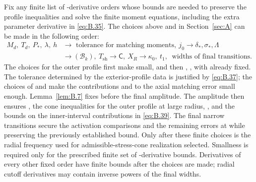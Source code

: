 \begin{remark}\label{rem:B.9}
Fix any finite list of -derivative orders whose bounds are needed to preserve
the profile inequalities and solve the finite moment equations, including the extra parameter
derivative in \eqref{eq:B.35}. The choices above and in Section~\ref{sec:A} can be made in the following order:
\begin{equation}
\begin{aligned}
 M_d,\ T_d,\ P_*,\ \lambda,\ h
 &\longrightarrow \text{ tolerance for matching moments},\ j_0
 \longrightarrow \delta_*,\sigma_*,\Lambda\\
 &\longrightarrow (\mathcal B_k),\ T_{\mathrm{sh}}
 \longrightarrow \mathsf C,\ X_R
 \longrightarrow \kappa_0,\ t_1,\ \text{ widths of final transitions}.
\end{aligned}
\tag{B.40}\label{eq:B.40}
\end{equation}
The choices for the outer profile first make
 small, and then
,
, with  already fixed. The tolerance determined by the exterior-profile data
is justified by \eqref{eq:B.37}; the choices of  and  make the contributions
 and  to the
axial matching error small enough. Lemma~\ref{lem:B.7} fixes  before the final amplitude. The
amplitude then ensures
, the cone inequalities for the outer profile at
large radius, , and the bounds on the inner-interval contributions in \eqref{eq:B.39}.
The final narrow transitions secure the activation comparisons and the remaining errors at
 while preserving the previously established bound. Only after these finite choices
is the radial frequency used for admissible-stress-cone realization selected. Smallness is
required only for the prescribed finite set of -derivative bounds. Derivatives of every other
fixed order have finite bounds after the choices are made; radial cutoff derivatives may
contain inverse powers of the final widths.
\end{remark}

